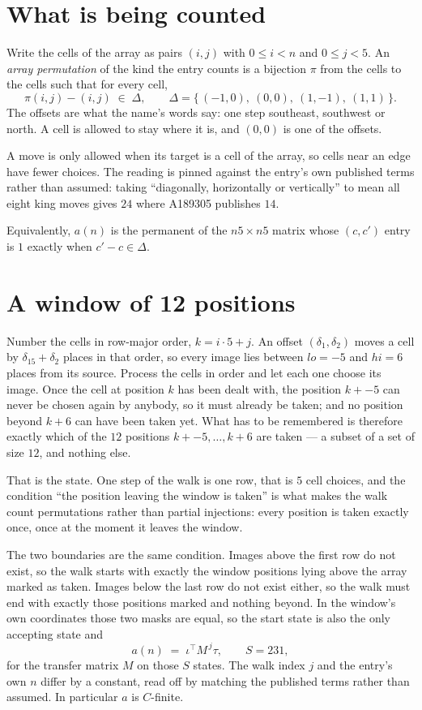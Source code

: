 \documentclass[11pt,a4paper]{article}
\theoremstyle{plain}
\theoremstyle{definition}
\begin{document}
\section{What is being counted}

Write the cells of the array as pairs $(i,j)$ with $0\le i<n$ and $0\le j<5$. An
\emph{array permutation} of the kind the entry counts is a bijection $\pi$ from the cells to
the cells such that for every cell,
\[
\pi(i,j)-(i,j)\;\in\;\Delta,\qquad
\Delta=\{\,(-1,0),\ (0,0),\ (1,-1),\ (1,1)\,\}.
\]
The offsets are what the name's words say: one step southeast, southwest or north. A cell is allowed to stay where it is, and $(0,0)$ is one of the offsets.

A move is only allowed when its target is a cell of the array, so cells near an
edge have fewer choices. The reading is pinned against the entry's own published terms rather
than assumed: taking ``diagonally, horizontally or vertically'' to mean all eight king moves
gives $24$ where A189305 publishes $14$.

Equivalently, $a(n)$ is the permanent of the $n5\times n5$ matrix whose $(c,c')$ entry is
$1$ exactly when $c'-c\in\Delta$.

\section{A window of 12 positions}

Number the cells in row-major order, $k=i\cdot5+j$. An offset $(\delta_1,\delta_2)$ moves a
cell by $\delta_15+\delta_2$ places in that order, so every image lies between $lo=-5$ and
$hi=6$ places from its source. Process the cells in order and let each one choose its image.
Once the cell at position $k$ has been dealt with, the position $k+-5$ can never be chosen
again by anybody, so it must already be taken; and no position beyond $k+6$ can have been
taken yet. What has to be remembered is therefore exactly which of the $12$ positions
$k+-5,\dots,k+6$ are taken --- a subset of a set of size $12$, and nothing else.

That is the state. One step of the walk is one row, that is $5$ cell choices, and the
condition ``the position leaving the window is taken'' is what makes the walk count permutations
rather than partial injections: every position is taken exactly once, once at the moment it
leaves the window.

The two boundaries are the same condition. Images above the first row do not exist, so the walk
starts with exactly the window positions lying above the array marked as taken. Images below the
last row do not exist either, so the walk must end with exactly those positions marked and
nothing beyond. In the window's own coordinates those two masks are equal, so the start state is
also the only accepting state and
\[
a(n)\;=\;\iota^{\!\top}M^{\,j}\tau ,\qquad S=231,
\]
for the transfer matrix $M$ on those $S$ states. The walk index $j$ and the entry's own $n$
differ by a constant, read off by matching the published terms rather than assumed. In
particular $a$ is $C$-finite.
\end{document}
